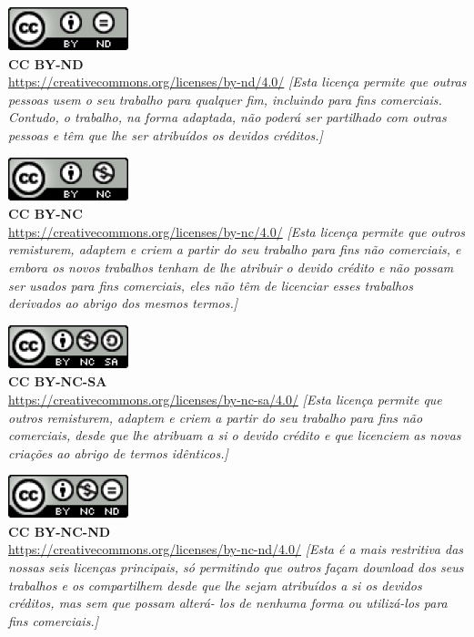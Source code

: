 
\noindent
\includegraphics[]{images/CCBYND.png}
\\
\textbf{CC BY-ND}
\\
\url{https://creativecommons.org/licenses/by-nd/4.0/}
\textit{[Esta licença permite que outras pessoas usem o seu trabalho para qualquer fim, incluindo para fins comerciais. Contudo, o trabalho, na forma adaptada, não poderá ser partilhado com outras pessoas e têm que lhe ser atribuídos os devidos créditos.]}


\noindent
\includegraphics[]{images/CCBYNC.png}
\\
\textbf{CC BY-NC}
\\
\url{https://creativecommons.org/licenses/by-nc/4.0/}
\textit{[Esta licença permite que outros remisturem, adaptem e criem a partir do seu trabalho para fins não comerciais, e embora os novos trabalhos tenham de lhe atribuir o devido crédito e não possam ser usados para fins comerciais, eles não têm de licenciar esses trabalhos derivados ao abrigo dos mesmos termos.]}


\noindent
\includegraphics[]{images/CCBYNCSA.png}
\\
\textbf{CC BY-NC-SA}
\\
\url{https://creativecommons.org/licenses/by-nc-sa/4.0/}
\textit{[Esta licença permite que outros remisturem, adaptem e criem a partir do seu trabalho para fins não comerciais, desde que lhe atribuam a si o devido crédito e que licenciem as novas criações ao abrigo de termos idênticos.]}


\noindent
\includegraphics[]{images/CCBYNCND.png}
\\
\textbf{CC BY-NC-ND}
\\
\url{https://creativecommons.org/licenses/by-nc-nd/4.0/}
\textit{[Esta é a mais restritiva das nossas seis licenças principais, só permitindo que outros façam download dos seus trabalhos e os compartilhem desde que lhe sejam atribuídos a si os devidos créditos, mas sem que possam alterá- los de nenhuma forma ou utilizá-los para fins comerciais.]}
